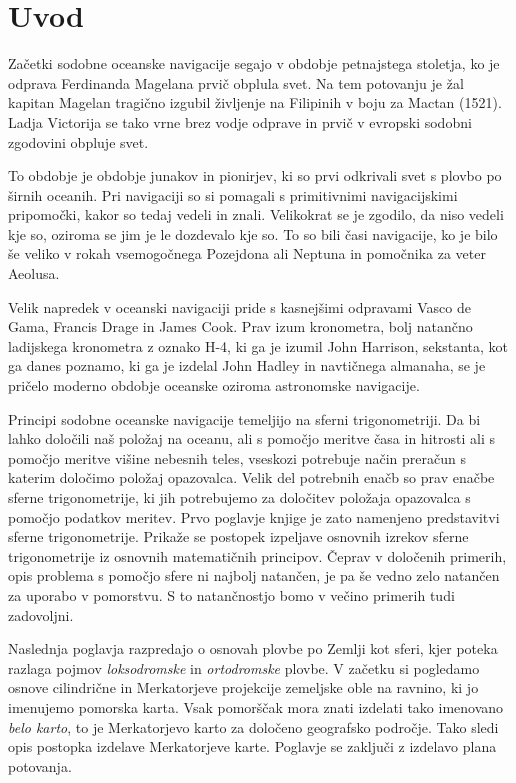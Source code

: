 \chapter{Uvod}

Začetki sodobne oceanske navigacije segajo v obdobje petnajstega stoletja, ko je odprava Ferdinanda Magelana prvič obplula svet. Na tem potovanju je žal kapitan Magelan tragično izgubil življenje na Filipinih v boju za Mactan (1521). Ladja Victorija se tako vrne brez vodje odprave in prvič v evropski sodobni zgodovini obpluje svet.

To obdobje je obdobje junakov in pionirjev, ki so prvi odkrivali svet s plovbo po širnih oceanih. Pri navigaciji so si pomagali s primitivnimi navigacijskimi pripomočki, kakor so tedaj vedeli in znali. Velikokrat se je zgodilo, da niso vedeli kje so, oziroma se jim je le dozdevalo kje so. To so bili časi navigacije, ko je bilo še veliko v rokah vsemogočnega Pozejdona ali Neptuna in pomočnika za veter Aeolusa. 

Velik napredek v oceanski navigaciji pride s kasnejšimi odpravami Vasco de Gama, Francis Drage in James Cook. Prav izum kronometra, bolj natančno ladijskega kronometra z oznako H-4, ki ga je izumil John Harrison, sekstanta, kot ga danes poznamo, ki ga je izdelal John Hadley in navtičnega almanaha, se je pričelo moderno obdobje oceanske oziroma astronomske navigacije.

Principi sodobne oceanske navigacije temeljijo na sferni trigonometriji. Da bi lahko določili naš položaj na oceanu, ali s pomočjo meritve časa in hitrosti ali s pomočjo meritve višine nebesnih teles, vseskozi potrebuje način preračun s katerim določimo položaj opazovalca. Velik del potrebnih enačb so prav enačbe sferne trigonometrije, ki jih potrebujemo za določitev položaja opazovalca s pomočjo podatkov meritev. Prvo poglavje knjige je zato namenjeno predstavitvi sferne trigonometrije. Prikaže se postopek izpeljave osnovnih izrekov sferne trigonometrije iz osnovnih matematičnih principov. Čeprav v določenih primerih, opis problema s pomočjo sfere ni najbolj natančen, je pa še vedno zelo natančen za uporabo v pomorstvu. S to natančnostjo bomo v večino primerih tudi zadovoljni.

Naslednja poglavja razpredajo o osnovah plovbe po Zemlji kot sferi, kjer poteka razlaga pojmov \emph{loksodromske} in \emph{ortodromske} plovbe. V začetku si pogledamo osnove cilindrične in Merkatorjeve projekcije zemeljske oble na ravnino, ki jo imenujemo pomorska karta. Vsak pomorščak mora znati izdelati tako imenovano \emph{belo karto}, to je Merkatorjevo karto za določeno geografsko področje. Tako sledi opis postopka izdelave Merkatorjeve karte. Poglavje se zaključi z izdelavo plana potovanja. 

